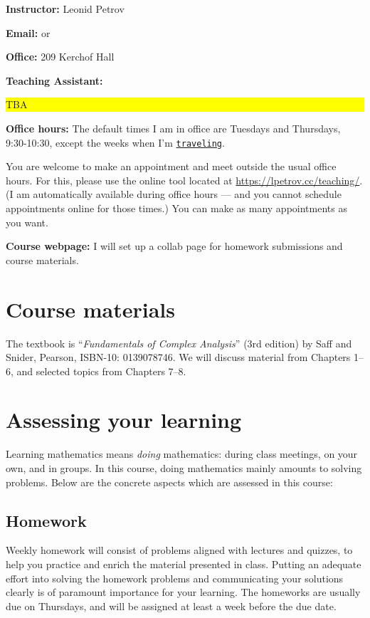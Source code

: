 \documentclass[oneside,11pt]{amsart}
\begin{document}
\medskip

\textbf{Instructor:} Leonid Petrov
\medskip

\textbf{Email:}  or 
\medskip

\textbf{Office:} 209 Kerchof Hall
\medskip

\textbf{Teaching Assistant:} \colorbox{yellow}{\parbox{.7\textwidth}{TBA}}
\medskip

\textbf{Office hours:}
The default times I am in office are Tuesdays and Thursdays, 9:30-10:30,
except the weeks when I'm \href{https://lpetrov.cc/2019/05/travel-2020/}{\texttt{traveling}}.

You are welcome to make an appointment and meet outside the usual office hours. 
For this, please use the online tool located at
\url{https://lpetrov.cc/teaching/}. (I am automatically available during office hours --- 
and you cannot schedule appointments online for those times.)
You can make as 
many appointments as you want.

\medskip

\textbf{Course webpage:}
I will set up a collab page for homework submissions and course materials.

\section{Course materials}

The textbook is “\emph{Fundamentals of Complex Analysis}” (3rd edition)
by Saff and Snider, Pearson, ISBN-10: 0139078746.
We will discuss material from Chapters 1--6, and selected topics from Chapters 7--8.

\section{Assessing your learning}

Learning mathematics means \emph{doing} mathematics: during class meetings, on your own, and in groups. 
In this course, doing mathematics mainly amounts to solving problems. 
Below are the concrete aspects which are assessed in this course:

\subsection{Homework}

Weekly homework will consist of
problems aligned with lectures and quizzes,
to help you practice and enrich the material presented in class.
Putting an adequate effort into solving the homework
problems and
communicating your solutions clearly is
of paramount importance for your learning.
The homeworks are usually due on
Thursdays, and will be assigned at least a week before the due
date.
\end{document}
